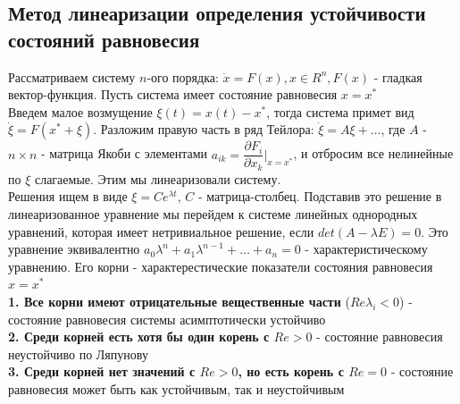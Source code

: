\begin{multicols*}{2}
		\section{Метод линеаризации определения устойчивости состояний равновесия}
		Рассматриваем систему $n$-ого порядка: $\dot{x} = F(x), x\in R^n, F(x)$ - гладкая вектор-функция. Пусть система имеет состояние равновесия $x = x^*$\\ Введем малое возмущение $\xi(t) = x(t) - x^*$, тогда система примет вид $\dot{\xi} = F(x^* + \xi)$. Разложим правую часть в ряд Тейлора: $\dot{\xi} = A\xi + \dots$, где $A$ - $n\times n$ - матрица Якоби с элементами $a_{ik} = \dfrac{\partial F_i}{\partial x_k}|_{x=x^*}$, и отбросим все нелинейные по $\xi$ слагаемые. Этим мы линеаризовали систему.\\
		Решения ищем в виде $\xi = Ce^{\lambda t}$, $C$ - матрица-столбец. Подставив это решение в линеаризованное уравнение мы перейдем к системе линейных однородных уравнений, которая имеет нетривиальное решение, если $det (A-\lambda E) = 0$. Это уравнение эквивалентно $a_0 \lambda ^n + a_1 \lambda ^{n-1} + \dots + a_n = 0$ - характеристическому уравнению. Его корни - характерестические показатели состояния равновесия $x=x^*$\\
		\textbf{1. Все корни имеют отрицательные вещественные части} ($Re \lambda_i < 0$) - состояние равновесия системы асимптотически устойчиво\\
		\textbf{2. Среди корней есть хотя бы один корень с $Re > 0$} - состояние равновесия неустойчиво по Ляпунову\\
		\textbf{3. Среди корней нет значений с $Re > 0$, но есть корень с $Re = 0$} - состояние равновесия может быть как устойчивым, так и неустойчивым
		

\end{multicols*}
